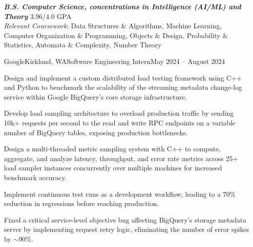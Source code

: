 \documentclass{article}
\begin{document}
\thispagestyle{empty}


\begin{flushleft}


{\textbf{\textit{B.S. Computer Science, concentrations in Intelligence (AI/ML) and Theory}} \hfill 3.96/4.0 GPA \\ \textit{Relevant Coursework}:
    Data Structures \& Algorithms,
    Machine Learning,
    Computer Organization \& Programming,
    Objects \& Design,
    Probability \& Statistics,
    Automata \& Complexity,
    Number Theory%
}



    \begin{experience}{Google}{Kirkland, WA}{Software Engineering Intern}{May 2024 -- August 2024}
        \item Design and implement a custom distributed load testing framework using C++ and Python to benchmark the scalability of the streaming metadata change-log service within Google BigQuery's core storage infrastructure.
        \item Develop load sampling architecture to overload production traffic by sending 10k+ requests per second to the read and write RPC endpoints on a variable number of BigQuery tables, exposing production bottlenecks.
        \item Design a multi-threaded metric sampling system with C++ to compute, aggregate, and analyze latency, throughput, and error rate metrics across 25+ load sampler instances concurrently over multiple machines for increased benchmark accuracy.
        \item Implement continuous test runs as a development workflow, leading to a 70\% reduction in regressions before reaching production.
        \item Fixed a critical service-level objective bug affecting BigQuery's storage metadata server by implementing request retry logic, eliminating the number of error spikes by $\sim$90\%.
    \end{experience}


\end{flushleft}
\end{document}
